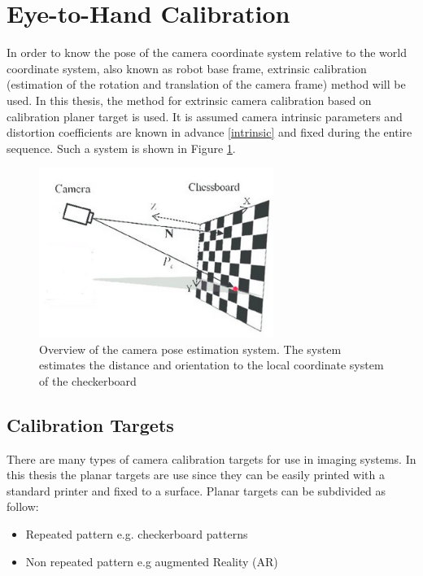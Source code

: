 \section{Eye-to-Hand Calibration}

In order to know the pose of the camera coordinate system relative to the world coordinate system, also known as robot base frame, extrinsic calibration (estimation of the rotation and translation of the camera frame) method will be used. In this thesis, the method for extrinsic camera calibration based on calibration planer target is used. It is assumed camera intrinsic parameters and distortion coefficients are known in advance \ref{intrinsic} and fixed during the entire sequence. Such a system is shown in Figure \ref{fig:camposest}.


\begin{figure}[!h]
\begin{center}
\includegraphics[width=3in]{figures03/camposest.png}
\caption{Overview of the camera pose estimation system. The system estimates the distance
and orientation to the local coordinate system of the checkerboard}%
\label{fig:camposest}
\end{center}
\end{figure}

\subsection{Calibration Targets}\label{caltar}
There are many types of camera calibration targets for use in imaging systems. In this thesis the planar targets are use since they can be easily printed with a standard
printer and fixed to a surface. Planar targets can be subdivided as follow:
\begin{itemize}
\item Repeated pattern e.g. checkerboard patterns 
\item Non repeated pattern e.g augmented Reality (AR)
\end{itemize}

